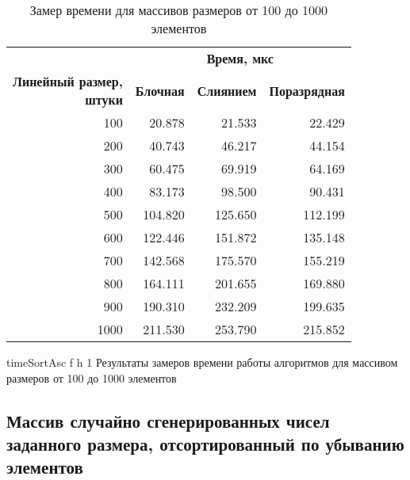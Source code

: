\begin{table}[ht]
	\small
	\begin{center}
		\begin{threeparttable}
			\caption{Замер времени для массивов размеров от 100 до 1000 элементов}
			\label{tbl:timeAsc}
			\begin{tabular}{|r|r|r|r|}
				\hline
				& \multicolumn{3}{c|}{\bfseries Время, мкс} \\ \cline{2-4}
				\bfseries \makecell{Линейный размер, \\ штуки} & \bfseries Блочная & \bfseries Слиянием & \bfseries Поразрядная \\ \cline{2-4}
				\hline
				100 & 20.878 & 21.533 & 22.429 \\
				\hline
				200 & 40.743 & 46.217 & 44.154 \\
				\hline
				300 & 60.475 & 69.919 & 64.169 \\
				\hline
				400 & 83.173 & 98.500 & 90.431 \\
				\hline
				500 & 104.820 & 125.650 & 112.199 \\
				\hline
				600 & 122.446 & 151.872 & 135.148 \\
				\hline
				700 & 142.568 & 175.570 & 155.219 \\
				\hline
				800 & 164.111 & 201.655 & 169.880 \\
				\hline
				900 & 190.310 & 232.209 & 199.635 \\
				\hline
				1000 & 211.530 & 253.790 & 215.852 \\
				\hline
			\end{tabular}	
		\end{threeparttable}
	\end{center}
\end{table}

\clearpage

{timeSortAsc} %
{f} %
{h} %
{1\textwidth} %
{Результаты замеров времени работы алгоритмов для массивом размеров от 100 до 1000 элементов} %


\subsection{Массив случайно сгенерированных чисел заданного размера, отсортированный по убыванию элементов}

